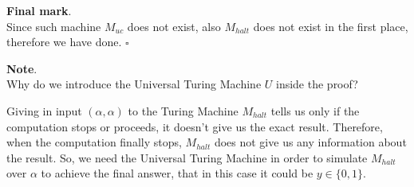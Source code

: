 \begin{example}[title = Undecidability halting problem]
    \textbf{Final mark}. \\
    Since such machine $M_{uc}$ does not exist, also $M_{halt}$ does not exist in the first place, therefore we have done. $\square$ \vspace{14pt}

    \textbf{Note}. \\
    Why do we introduce the Universal Turing Machine $U$ inside the proof?
    
    Giving in input $(\alpha, \alpha)$ to the Turing Machine $M_{halt}$ tells us only if the computation stops or proceeds, it doesn't give us the exact result. Therefore,
    when the computation finally stops, $M_{halt}$ does not give us any information about the result. So, we need the Universal Turing Machine in order to simulate
    $M_{halt}$ over $\alpha$ to achieve the final answer, that in this case it could be $y \in \{0,1\}$.
\end{example}
